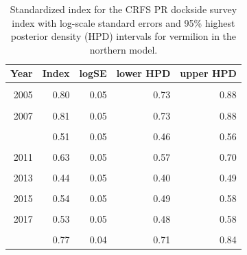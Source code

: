 \documentclass[11pt,
  english,
]{article}
\begin{document}
\begin{table}

\caption{\label{tab:tab-index-crfspr}Standardized index for the CRFS PR dockside survey index with log-scale standard errors and 95\% highest
       posterior density (HPD) intervals for vermilion in the northern model.}
\centering
\begin{tabular}[t]{rrrrr}
\toprule
Year & Index & logSE & lower HPD & upper HPD\\
\midrule
\cellcolor{gray!6}{2004} & \cellcolor{gray!6}{0.80} & \cellcolor{gray!6}{0.05} & \cellcolor{gray!6}{0.72} & \cellcolor{gray!6}{0.87}\\
2005 & 0.80 & 0.05 & 0.73 & 0.88\\
\cellcolor{gray!6}{2006} & \cellcolor{gray!6}{0.86} & \cellcolor{gray!6}{0.04} & \cellcolor{gray!6}{0.78} & \cellcolor{gray!6}{0.93}\\
2007 & 0.81 & 0.05 & 0.73 & 0.88\\
\cellcolor{gray!6}{2008} & \cellcolor{gray!6}{0.58} & \cellcolor{gray!6}{0.05} & \cellcolor{gray!6}{0.52} & \cellcolor{gray!6}{0.65}\\
\addlinespace
2009 & 0.51 & 0.05 & 0.46 & 0.56\\
\cellcolor{gray!6}{2010} & \cellcolor{gray!6}{0.62} & \cellcolor{gray!6}{0.05} & \cellcolor{gray!6}{0.55} & \cellcolor{gray!6}{0.68}\\
2011 & 0.63 & 0.05 & 0.57 & 0.70\\
\cellcolor{gray!6}{2012} & \cellcolor{gray!6}{0.52} & \cellcolor{gray!6}{0.05} & \cellcolor{gray!6}{0.47} & \cellcolor{gray!6}{0.58}\\
2013 & 0.44 & 0.05 & 0.40 & 0.49\\
\addlinespace
\cellcolor{gray!6}{2014} & \cellcolor{gray!6}{0.49} & \cellcolor{gray!6}{0.05} & \cellcolor{gray!6}{0.44} & \cellcolor{gray!6}{0.54}\\
2015 & 0.54 & 0.05 & 0.49 & 0.58\\
\cellcolor{gray!6}{2016} & \cellcolor{gray!6}{0.57} & \cellcolor{gray!6}{0.05} & \cellcolor{gray!6}{0.52} & \cellcolor{gray!6}{0.62}\\
2017 & 0.53 & 0.05 & 0.48 & 0.58\\
\cellcolor{gray!6}{2018} & \cellcolor{gray!6}{0.63} & \cellcolor{gray!6}{0.04} & \cellcolor{gray!6}{0.58} & \cellcolor{gray!6}{0.69}\\
\addlinespace
2019 & 0.77 & 0.04 & 0.71 & 0.84\\
\bottomrule
\end{tabular}
\end{table}
\end{document}
